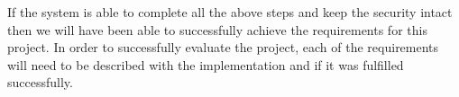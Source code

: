 \documentclass[../main.tex]{subfiles}
\begin{document}
If the system is able to complete all the above steps and keep the security intact then we will have been able to successfully achieve the requirements for this project. In order to successfully evaluate the project, each of the requirements will need to be described with the implementation and if it was fulfilled successfully. 
\end{document}
